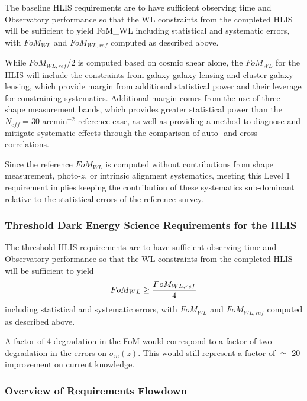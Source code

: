 The baseline HLIS requirements are to have sufficient observing time and
Observatory performance so that the WL constraints from the completed HLIS will
be sufficient to yield
\bea
FoM_{WL} 
\eea
including statistical and systematic errors, with $FoM_{WL}$ and $FoM_{WL,ref}$ computed as described above.

While $FoM_{WL,ref}$/2 is computed based on cosmic shear alone, the $FoM_{WL}$
for the HLIS will include the constraints from galaxy-galaxy lensing and
cluster-galaxy lensing, which provide margin from additional statistical power
and their leverage for constraining systematics.  Additional margin comes from
the use of three shape measurement bands, which provides greater statistical
power than the $N_{eff}= 30$ arcmin$^{-2}$ reference case, as well as providing a method
to diagnose and mitigate systematic effects through the comparison of auto- and
cross-correlations.

Since the reference $FoM_{WL}$ is computed without contributions from shape
measurement, photo-$z$, or intrinsic alignment systematics, meeting this Level 1
requirement implies keeping the contribution of these systematics sub-dominant
relative to the statistical errors of the reference survey.

\subsubsection{Threshold Dark Energy Science Requirements for the HLIS}

The threshold HLIS requirements are to have sufficient observing time and
Observatory performance so that the WL constraints from the completed HLIS will
be sufficient to yield
\begin{eqnarray}
FoM_{WL}\geq {FoM_{WL,ref}\over 4}
\end{eqnarray}
including statistical and systematic errors, with $FoM_{WL}$ and $FoM_{WL,ref}$ computed as described above.

A factor of 4 degradation in the FoM would correspond to a factor of two
degradation in the errors on $\sigma_m(z)$.  This would still represent a factor
of $\simeq$ 20 improvement on current knowledge.

\subsubsection{Overview of Requirements Flowdown}

